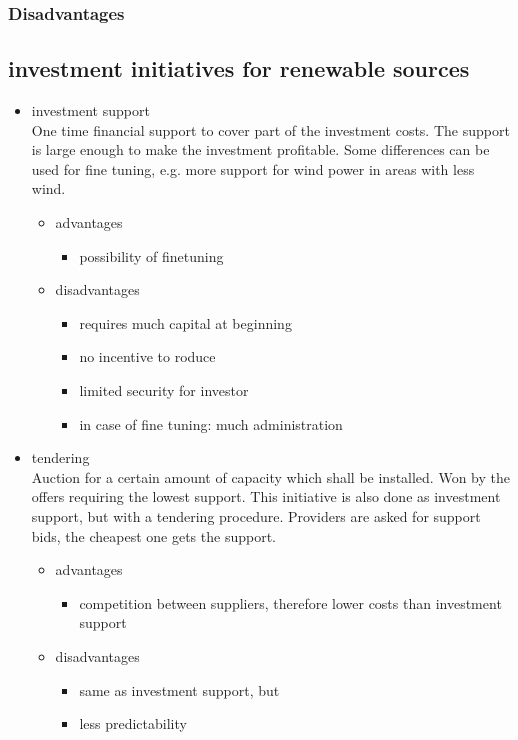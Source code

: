 \documentclass{article}
\begin{document}
\subsubsection{Disadvantages}
\subsection{investment initiatives for renewable sources}
\begin{itemize}
\item investment support\\
One time financial support to cover part of the investment costs.  The support is large enough to make the investment profitable. Some differences can be used for fine tuning, e.g. more support for wind power in areas with less wind.
\begin{itemize}
\item advantages
\begin{itemize}
\item possibility of finetuning
\end{itemize}
\item disadvantages
\begin{itemize}
\item requires much capital at beginning
\item no incentive to roduce
\item limited security for investor
\item in case of fine tuning: much administration
\end{itemize}
\end{itemize}
\item tendering\\
Auction for a certain amount of capacity which shall be installed. Won by the offers requiring the lowest support. This initiative is also done as investment support, but with a tendering procedure. Providers are asked for support bids, the cheapest one gets the support.
\begin{itemize}
\item advantages
\begin{itemize}
\item competition between suppliers, therefore lower costs than investment support
\end{itemize}
\item disadvantages
\begin{itemize}
\item same as investment support, but
\item less predictability

\end{itemize}
\end{itemize}
\end{itemize}
\end{document}
